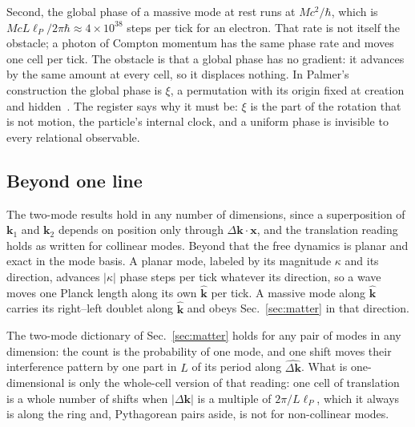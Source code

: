 \documentclass[aps,prd,twocolumn,superscriptaddress,nofootinbib]{revtex4-2}
\begin{document}
Second, the global phase of a massive mode at rest runs at $Mc^2/\hbar$, which is $McL\ell_P/2\pi\hbar\approx4\times10^{38}$ steps per tick for an electron. That rate is not itself the obstacle; a photon of Compton momentum has the same phase rate and moves one cell per tick. The obstacle is that a global phase has no gradient: it advances by the same amount at every cell, so it displaces nothing. In Palmer's construction the global phase is $\xi$, a permutation with its origin fixed at creation and hidden~\cite{palmer2026c}. The register says why it must be: $\xi$ is the part of the rotation that is not motion, the particle's internal clock, and a uniform phase is invisible to every relational observable.


\subsection{Beyond one line}
\label{sec:beyond}

The two-mode results hold in any number of dimensions, since a superposition of $\mathbf{k}_1$ and $\mathbf{k}_2$ depends on position only through $\Delta\mathbf{k}\cdot\mathbf{x}$, and the translation reading holds as written for collinear modes. Beyond that the free dynamics is planar and exact in the mode basis. A planar mode, labeled by its magnitude $\kappa$ and its direction, advances $|\kappa|$ phase steps per tick whatever its direction, so a wave moves one Planck length along its own $\hat{\mathbf{k}}$ per tick. A massive mode along $\hat{\mathbf{k}}$ carries its right--left doublet along $\hat{\mathbf{k}}$ and obeys Sec.~\ref{sec:matter} in that direction.

The two-mode dictionary of Sec.~\ref{sec:matter} holds for any pair of modes in any dimension: the count is the probability of one mode, and one shift moves their interference pattern by one part in $L$ of its period along $\hat{\Delta\mathbf{k}}$. What is one-dimensional is only the whole-cell version of that reading: one cell of translation is a whole number of shifts when $|\Delta\mathbf{k}|$ is a multiple of $2\pi/L\ell_P$, which it always is along the ring and, Pythagorean pairs aside, is not for non-collinear modes.
\end{document}
